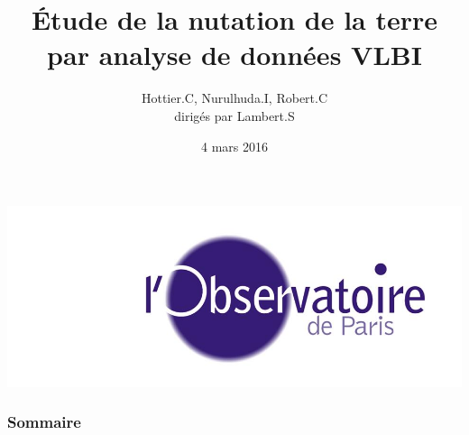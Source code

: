 \documentclass[french]{beamer}
\title[Soutenance MT3]{Étude de la nutation de la terre par analyse de données VLBI}
\author[Hottier.C, Nurulhuda.I, Robert.C]{Hottier.C, Nurulhuda.I, Robert.C\\dirigés par Lambert.S}
\date{4 mars 2016}
\begin{document}
\begin{frame}
  \maketitle
  \begin{center}
    \includegraphics[height=0.20\textheight]{Figures/siteon0.jpg}
  \end{center}
\end{frame}

\begin{frame}
  \frametitle{Sommaire}
  \tableofcontents
\end{frame}
















\end{document}
